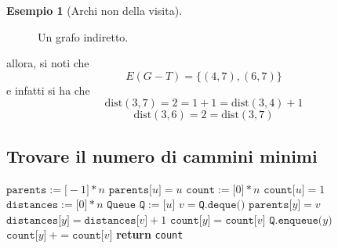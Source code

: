 \documentclass[14pt]{extreport}
\theoremstyle{definition}
\theoremstyle{definition}
\newtheorem{example}{Esempio}[subsection]
\begin{document}
\begin{example}[Archi non della visita]
\begin{figure}[H]
        \caption{Un grafo indiretto.}
    \end{figure}

    allora, si noti che $$E(G - T) = \{(4, 7), (6, 7)\}$$ e infatti si ha che $$\mathrm{dist}(3, 7) = 2 = 1 + 1 = \mathrm{dist}(3, 4) + 1$$ $$\mathrm{dist}(3, 6) = 2 = \mathrm{dist}(3, 7)$$
\end{example}

\subsection{Trovare il numero di cammini minimi}

\begin{algorithm}[H]
    \caption{
        Dato un grafo $G$, rappresentato attraverso liste di adiacenza, ed un suo vertice $u$, per ogni $v \in V(G)$, l'algoritmo restituisce il numero di cammini minimi della forma $u \rightarrow v$.\\
        \textbf{Input}: $G$ grafo, rappresentato attraverso liste di adiacenza; $u \in V(G)$ un vertice di $G$.\\
        \textbf{Output}: per ogni vertice $v \in V(G)$, il numero di cammini minimi della forma $u \rightarrow v$.
    }

    \begin{algorithmic}[1]
            \State $\texttt{parents}:=\texttt{[}-1\texttt{]} * n$
            \State $\texttt{parents[}u\texttt{]} = u$
            \State $\texttt{count}:=\texttt{[}0\texttt{]} * n$
            \State $\texttt{count[}u\texttt{]}= 1$ 
            \State $\texttt{distances}:=\texttt{[}0\texttt{]} * n$
            \State $\texttt{Queue Q} := \texttt{[}u\texttt{]}$
                \State $v = \texttt{Q.deque()}$
                     
                        \State $\texttt{parents[}y\texttt{]} = v$
                        \State $\texttt{distances[}y\texttt{]}=\texttt{distances[}v\texttt{]} + 1$
                        \State $\texttt{count[}y\texttt{]}=\texttt{count[}v\texttt{]}$
                        \State $\texttt{Q.enqueue(}y\texttt{)}$
                        \State $\texttt{count[}y\texttt{]} \ += \texttt{count[}v\texttt{]}$
                    \EndIf
                \EndFor
            \EndWhile
            \State \textbf{return} \texttt{count}
        \EndFunction
    \end{algorithmic}
\end{algorithm}
\end{document}
